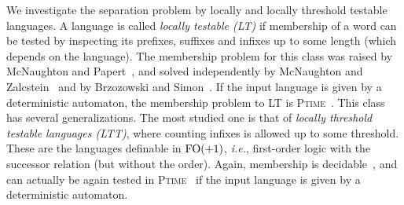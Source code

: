 \documentclass{LMCS}
\newcommand{\fos}{\ensuremath{\textup{FO}(+1)}\xspace}
\theoremstyle{plain}
\begin{document}
\smallskip We investigate the separation problem by locally and locally
threshold testable languages. A language is called \emph{locally testable
  (LT)} if membership of a word can be tested by inspecting its prefixes,
suffixes and infixes up to some length (which depends on the language).  The
membership problem for this class was raised by McNaughton and
Papert~\cite{mcnaughton&papert:1971:counter}, and solved independently by
McNaughton and
Zalcstein~\cite{Zalcstein:Locally-testable-languages:1972:a,McNaughton:Algebraic-decision-procedures-local:1974:a}
and by Brzozowski and
Simon~\cite{Brzozowski&Simon:Characterizations-locally-testable-events:1973:a}. If
the input language is given by a deterministic automaton, the membership problem to LT is 
\textsc{Ptime}~\cite{Kim&McNaughton&McCloskey:polynomial-time-algorithm-local:1989:a}.
This class has several generalizations. The most studied one is that of
\emph{locally threshold testable languages (LTT)}, where counting infixes is
allowed up to some threshold. These are the languages definable in \fos,
\emph{i.e.}, first-order logic with the successor relation (but without the
order). Again, membership is
decidable~\cite{Therien&Weiss:Graph-congruences-wreath-products:1985:a}, and
can actually be again tested in
\textsc{Ptime}~\cite{Pin:expressive-power-existential-first:1996:a,Pin:Expressive-power-existential-first-order:2005:a,Trahtman:Algorithm-Verify-Local-Threshold:2001:a}
if the input language is given by a deterministic automaton.
\end{document}
